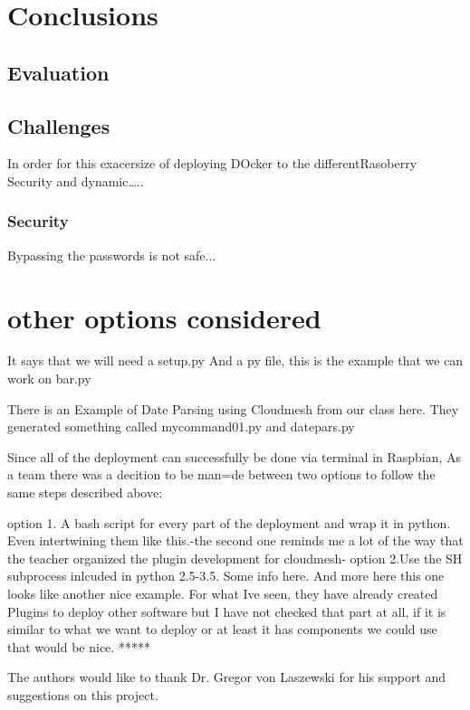 \documentclass[sigconf]{acmart}
\begin{document}
	\section{Conclusions}
	
	
	
	\subsection{Evaluation}
	
	\subsection{Challenges}
	In order for this exacersize of deploying DOcker to the differentRasoberry
	Security and dynamic…..
	
	\subsubsection{Security}
	Bypassing the passwords is not safe...
	
	
	\section{other options considered}
	It says that we will need a setup.py
	And a py file, this is the example that we can work on  bar.py
	
	There is an Example of Date Parsing using Cloudmesh from our class here. They generated something called mycommand01.py and datepars.py   
	
	Since all of the deployment can successfully be done via terminal in Raspbian, As a team there was a decition to be man=de between two options to follow the same steps described above:
	
	option 1. A bash script for every part of the deployment and wrap it in python. Even intertwining them like this.-the  second one reminds me a lot of the way that the teacher organized the plugin development for cloudmesh-  
	option 2.Use the SH subprocess inlcuded in python 2.5-3.5. Some info here. And more here this one looks like another nice example.  
	For what Ive seen, they have already created Plugins to deploy other software but I have not checked that part at all, if it is similar to what we want to deploy or at least it has components we could use that would be nice.  
	*****
	
	
	\begin{acks}
		The authors would like to thank Dr. Gregor von Laszewski for his support and suggestions on this project.
	\end{acks}
	
\end{document}
